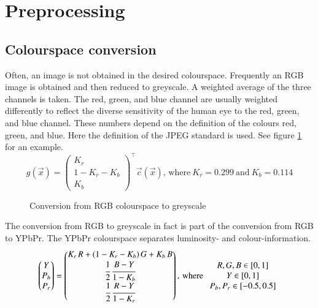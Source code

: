 \documentclass[a4paper,12pt]{book}
\begin{document}
\section{Preprocessing}
\subsection{Colourspace conversion}
Often, an image is not obtained in the desired colourspace. Frequently
an RGB image is obtained and then reduced to greyscale. A weighted average of
the three channels
is taken. The red, green, and blue channel are usually weighted differently
to reflect the diverse sensitivity of the human eye to the red, green, and
blue channel. These numbers depend on the definition of the colours red,
green, and blue. Here the definition of the JPEG standard\cite{RefWorks:441}
is used. %
See figure \ref{fig:grey} for an example.
\begin{equation*}
  g(\vec{x})=\begin{pmatrix}K_r\\1-K_r-K_b\\K_b\end{pmatrix}^\top
  \vec{c}(\vec{x})\mathrm{,\,where\ }K_r=0.299\mathrm{\ and\ }K_b=0.114
\end{equation*}
\begin{figure}[htbp]
   \begin{center}
     \begin{minipage}[c]{.45\textwidth}
     \end{minipage}
     \begin{minipage}[c]{.45\textwidth}
     \end{minipage}
     \caption{Conversion from RGB colourspace to greyscale\label{fig:grey}}
   \end{center}
\end{figure}
The conversion from RGB to greyscale in fact is part of the conversion
from RGB to YPbPr. The YPbPr colourspace separates luminosity- and
colour-information\cite{fourcc}.
\begin{equation*}
  \begin{pmatrix}Y\\P_b\\P_r\end{pmatrix}=
  \begin{pmatrix}K_r\,R+(1-K_r-K_b)\,G+K_b\,B\\
    \cfrac{1}{2}\,\cfrac{B-Y}{1-K_b}\\
    \cfrac{1}{2}\,\cfrac{R-Y}{1-K_r}\end{pmatrix}\mathrm{,\,where\ }
  \begin{array}{c}
    R,G,B\in[0,1]\\
    Y\in[0,1]\\
    P_b,P_r\in[-0.5,0.5]
  \end{array}
\end{equation*}
\end{document}
